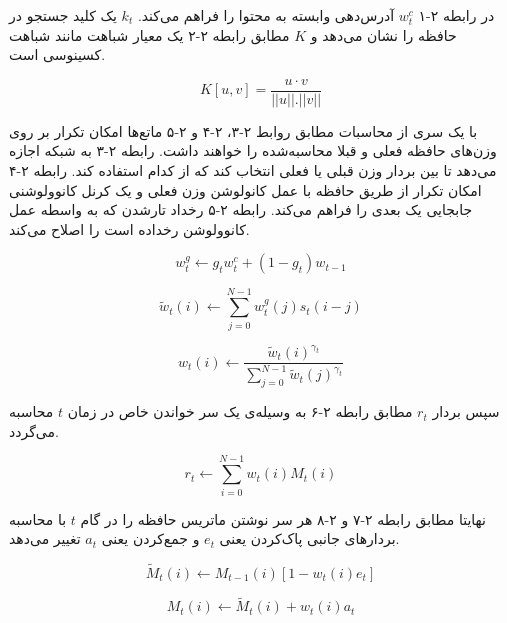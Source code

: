 در رابطه ۲-۱ $w_t^c$ آدرس‌دهی وابسته به محتوا را فراهم می‌کند. $k_t$ یک کلید جستجو در حافظه را نشان می‌دهد و $K$ مطابق رابطه ۲-۲ یک معیار شباهت مانند شباهت کسینوسی است.\cite{collier2018implementing}

\begin{equation}
K[u, v] = \frac{u·v}{||u||.||v||} 
\end{equation}

با یک سری از محاسبات مطابق روابط ۲-۳، ۲-۴ و ۲-۵ ماتع‌ها امکان تکرار بر روی وزن‌های حافظه فعلی و قبلا محاسبه‌شده را خواهند داشت. رابطه ۲-۳ به شبکه اجازه می‌دهد تا بین بردار وزن قبلی یا فعلی انتخاب کند که از کدام استفاده کند. رابطه ۲-۴ امکان تکرار از طریق حافظه با عمل کانولوشن وزن فعلی و یک کرنل کانوولوشنی جابجایی یک بعدی را فراهم می‌کند. رابطه ۲-۵ رخداد تارشدن که به واسطه عمل کانوولوشن رخداده است را اصلاح می‌کند.\cite{collier2018implementing}


\begin{equation}
w^g_t \leftarrow g_t w^c_t + (1 − g_t)w_{t−1}
\end{equation}

\begin{equation}
\tilde{w}_t(i) \leftarrow \sum^{N-1}_{j=0} w^g_t(j)s_t(i − j)
\end{equation}

\begin{equation}
w_t(i) \leftarrow \frac{\tilde{w}_t(i)^{\gamma_t}}{\sum_{j=0}^{N-1}\tilde{w}_t(j)^{\gamma_t}}
\end{equation}

سپس بردار $r_t$ مطابق رابطه ۲-۶ به وسیله‌ی یک سر خواندن خاص در زمان $t$ محاسبه می‌گردد.\cite{collier2018implementing}

\begin{equation}
r_t \leftarrow \sum_{i=0}^{N-1} w_t(i)M_t(i)
\end{equation}

نهایتا مطابق رابطه ۲-۷ و ۲-۸ هر سر نوشتن ماتریس حافظه را در گام $t$ با محاسبه بردارهای جانبی پاک‌کردن یعنی $e_t$ و جمع‌‌کردن یعنی $a_t$ تغییر می‌دهد.\cite{collier2018implementing}

\begin{equation}
\tilde{M}_t(i) \leftarrow M_{t-1}(i)[1-w_t(i)e_t]
\end{equation}

\begin{equation}
M_t(i) \leftarrow \tilde{M}_t(i) + w_t(i)a_t
\end{equation}

